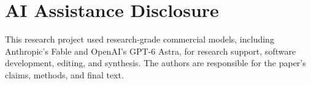 \documentclass[11pt]{article}
\theoremstyle{remark}
\theoremstyle{plain}
\begin{document}
\section*{AI Assistance Disclosure}
This research project used research-grade commercial models, including
Anthropic's Fable and OpenAI's GPT-6 Astra, for research support, software
development, editing, and synthesis. The authors are responsible for the
paper's claims, methods, and final text.
\end{document}
